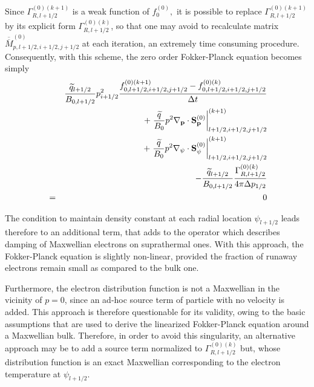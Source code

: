 Since $\Gamma _{R,l+1/2}^{\left( 0\right) (k+1)}$ is a weak function of $%
f_{0}^{\left( 0\right) },$ it is possible to replace $\Gamma
_{R,l+1/2}^{\left( 0\right) (k+1)}$ by its explicit form $\Gamma
_{R,l+1/2}^{\left( 0\right) (k)}$, so that one may avoid to recalculate
matrix $\overline{\overline{M}}_{p,l+1/2,i+1/2,j+1/2}^{\left( 0\right) }$ at
each iteration, an extremely time consuming procedure. Consequently, with
this scheme, the zero order Fokker-Planck equation becomes simply
\begin{eqnarray}
&&\frac{\widetilde{q}_{l+1/2}}{B_{0,l+1/2}}p_{i+1/2}^{2}\frac{%
f_{0,l+1/2,i+1/2,j+1/2}^{\left( 0\right)
(k+1)}-f_{0,l+1/2,i+1/2,j+1/2}^{\left( 0\right) (k)}}{\Delta t}  \nonumber \\
&&+\left. \frac{\widetilde{q}}{B_{0}}p^{2}\nabla _{\mathbf{p}}\cdot \mathbf{S%
}_{\mathbf{p}}^{\left( 0\right) }\right| _{l+1/2,i+1/2,j+1/2}^{(k+1)}
\nonumber \\
&&+\left. \frac{\widetilde{q}}{B_{0}}p^{2}\nabla _{\psi }\cdot \mathbf{S}%
_{\psi }^{\left( 0\right) }\right| _{l+1/2,i+1/2,j+1/2}^{(k+1)}  \nonumber \\
&&-\frac{\widetilde{q}_{l+1/2}}{B_{0,l+1/2}}\frac{\Gamma _{R,l+1/2}^{\left(
0\right) (k)}}{4\pi \Delta p_{1/2}}  \nonumber \\
&=&0
\end{eqnarray}

The condition to maintain density constant at each radial location $\psi
_{l+1/2}$ leads therefore to an additional term, that adds to the operator
which describes damping of Maxwellian electrons on suprathermal ones. With
this approach, the Fokker-Planck equation is slightly non-linear, provided
the fraction of runaway electrons remain small as compared to the bulk one.

Furthermore, the electron distribution function is not a Maxwellian in the
vicinity of $p=0$, since an ad-hoc source term of particle with no velocity
is added. This approach is therefore questionable for its validity, owing to
the basic assumptions that are used to derive the linearized Fokker-Planck
equation around a Maxwellian bulk. Therefore, in order to avoid this
singularity, an alternative approach may be to add a source term normalized
to $\Gamma _{R,l+1/2}^{\left( 0\right) (k)}$ but, whose distribution
function is an exact Maxwellian corresponding to the electron temperature at
$\psi _{l+1/2}.$

